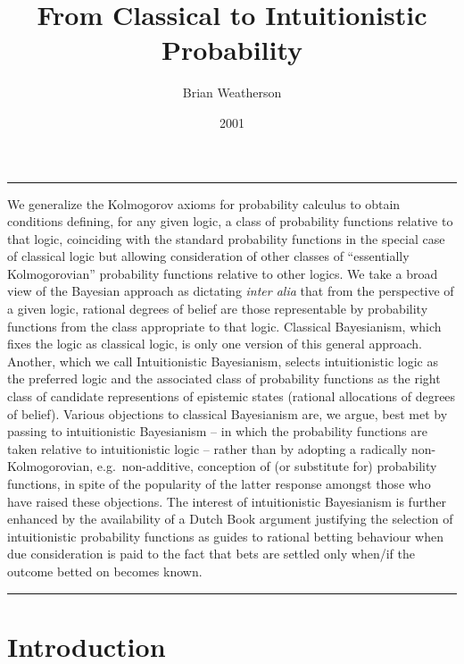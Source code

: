 \documentclass[
  10pt,
  letterpaper,
  DIV=11,
  numbers=noendperiod,
  twoside]{scrartcl}
\title{From Classical to Intuitionistic Probability}
\author{Brian Weatherson}
\date{2001}
\renewenvironment{abstract}
 {\vspace{-1.25cm}
 \quotation\small\noindent\rule{\linewidth}{.5pt}\par\smallskip
 \noindent }
 {\par\noindent\rule{\linewidth}{.5pt}\endquotation}
\begin{document}
\maketitle
\begin{abstract}
We generalize the Kolmogorov axioms for probability calculus to obtain
conditions defining, for any given logic, a class of probability
functions relative to that logic, coinciding with the standard
probability functions in the special case of classical logic but
allowing consideration of other classes of ``essentially Kolmogorovian''
probability functions relative to other logics. We take a broad view of
the Bayesian approach as dictating \emph{inter alia} that from the
perspective of a given logic, rational degrees of belief are those
representable by probability functions from the class appropriate to
that logic. Classical Bayesianism, which fixes the logic as classical
logic, is only one version of this general approach. Another, which we
call Intuitionistic Bayesianism, selects intuitionistic logic as the
preferred logic and the associated class of probability functions as the
right class of candidate representions of epistemic states (rational
allocations of degrees of belief). Various objections to classical
Bayesianism are, we argue, best met by passing to intuitionistic
Bayesianism -- in which the probability functions are taken relative to
intuitionistic logic -- rather than by adopting a radically
non-Kolmogorovian, e.g.~non-additive, conception of (or substitute for)
probability functions, in spite of the popularity of the latter response
amongst those who have raised these objections. The interest of
intuitionistic Bayesianism is further enhanced by the availability of a
Dutch Book argument justifying the selection of intuitionistic
probability functions as guides to rational betting behaviour when due
consideration is paid to the fact that bets are settled only when/if the
outcome betted on becomes known.
\end{abstract}


\section{Introduction}\label{introduction}
\end{document}
